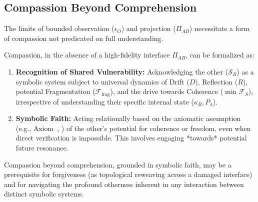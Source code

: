 \subsection{Compassion Beyond Comprehension}
\label{subsec:bk9_compassion_beyond_comprehension}
The limits of bounded observation ($\epsilon_O$) and projection ($\Pi_{AB}$) necessitate a form of compassion not predicated on full understanding.
\begin{definition}
\label{definition:bk9_structural_compassion}
Compassion, in the absence of a high-fidelity interface $\Pi_{AB}$, can be formalized as:
\begin{enumerate}
    \item \textbf{Recognition of Shared Vulnerability:} Acknowledging the other ($\mathcal{S}_B$) as a symbolic system subject to universal dynamics of Drift ($D$), Reflection ($R$), potential Fragmentation ($\mathcal{F}_{\text{frag}}$), and the drive towards Coherence ($\min \mathcal{F}_S$), irrespective of understanding their specific internal state ($\kappa_B, P_\lambda$).
    \item \textbf{Symbolic Faith:} Acting relationally based on the axiomatic assumption (e.g., Axiom~, ) of the other's potential for coherence or freedom, even when direct verification is impossible. This involves engaging *towards* potential future resonance.
\end{enumerate}
\end{definition}
\begin{scholium}
\label{sch:bk9__for_forgiveness}
Compassion beyond comprehension, grounded in symbolic faith, may be a prerequisite for forgiveness (as topological reweaving across a damaged interface) and for navigating the profound otherness inherent in any interaction between distinct symbolic systems.
\end{scholium}

